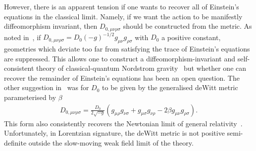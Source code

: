 \documentclass[aps,preprintnumbers,superscriptaddress,longbibliography]{revtex4-1}
\begin{document}
However, there is an apparent tension if one wants to recover all of Einstein's equations in the classical limit. Namely, if we want the action to be manifestly diffeomorphism invariant, then $D_{0, \mu \nu \rho \sigma}$ should be constructed from the metric. 
As noted in~\cite{oppenheim2023covariant}, if $D_{0, \mu \nu \rho \sigma}=D_0 (-g)^{-1/2}g_{\mu\nu}g_{\rho\sigma}$ with $D_0$ a positive constant, geometries which deviate too far from satisfying the trace of Einstein's equations are suppressed. This allows one to construct a diffeomorphism-invariant and self-consistent theory of classical-quantum Nordstrom gravity~\cite{UCLNordstrom} but whether one can recover the remainder of Einstein's equations has been an open question.
The other suggestion in~\cite{oppenheim2023covariant} was for $D_0$ to be given by the generalised deWitt metric parameterised by $\beta$
\begin{align}
\label{eq:dewitt}
D_{0,\mu \nu \rho \sigma}=\frac{D_0}{2\sqrt{-g}}\left(g_{\mu\rho} g_{\nu \sigma}+g_{\mu \sigma} g_{\nu \rho}-2\beta g_{\mu\nu} g_{\rho \sigma}\right).
\end{align} 
This form also consistently recovers the Newtonian limit of general relativity~\cite{layton2023weak}. Unfortunately, in Lorentzian signature, the deWitt metric is not positive semi-definite outside the slow-moving weak field limit of the theory. 
\end{document}
